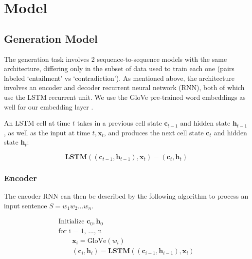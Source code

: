 \documentclass[a4paper, 12pt]{article}
\theoremstyle{definition}
\newtheorem{fact}{Fact}[section]
\begin{document}
%
%
%

\section{Model}

\subsection{Generation Model}

The generation task involves 2 sequence-to-sequence models with the same architecture, differing only in the subset of data used to train each one (pairs labeled `entailment' vs `contradiction'). As mentioned above, the architecture involves an encoder and decoder recurrent neural network (RNN), both of which use the LSTM \cite{lstm-schmid} recurrent unit. We use the GloVe pre-trained word embeddings as well for our embedding layer \cite{glove}.

\bigskip

An LSTM cell at time $t$ takes in a previous cell state $\mathbf{c}_{t-1}$ and hidden state $\mathbf{h}_{t-1}$, as well as the input at time $t, \mathbf{x}_t$, and produces the next cell state $\mathbf{c}_t$ and hidden state $\mathbf{h}_t$:

\[\textbf{LSTM}((\mathbf{c}_{t-1}, \mathbf{h}_{t-1}), \mathbf{x}_{t}) = (\mathbf{c}_{t}, \mathbf{h}_{t})\]

\subsubsection{Encoder}

The encoder RNN can then be described by the following algorithm to process an input sentence $S = w_1w_2...w_n$.

\begin{gather}
\text{Initialize } \mathbf{c}_0, \mathbf{h}_0 \\
\text{for i = 1, ..., n } \\
	\qquad \mathbf{x}_i = \text{GloVe}(w_i)  \\
	\qquad (\mathbf{c}_{i}, \mathbf{h}_{i}) = \textbf{LSTM}((\mathbf{c}_{i-1}, \mathbf{h}_{i-1}), \mathbf{x}_{i}) 
\end{gather}
\end{document}
